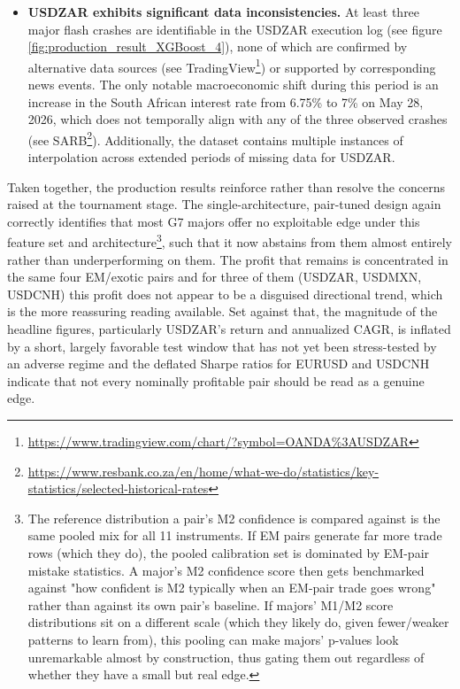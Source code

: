 \documentclass[12pt, a4paper]{article}
\begin{document}
\begin{itemize}
\item \textbf{USDZAR exhibits significant data inconsistencies.} At least three major flash crashes are identifiable in the USDZAR execution log 
(see figure \ref{fig:production_result_XGBoost_4}), none of which are confirmed by alternative data sources (see TradingView\footnote{\url{https://www.tradingview.com/chart/?symbol=OANDA\%3AUSDZAR}}) 
or supported by corresponding news events. The only notable macroeconomic shift during this period is an increase in the South African interest rate from 6.75\% to 7\% on 
May 28, 2026, which does not temporally align with any of the three observed crashes (see SARB\footnote{\url{https://www.resbank.co.za/en/home/what-we-do/statistics/key-statistics/selected-historical-rates}}). 
Additionally, the dataset contains multiple instances of interpolation across extended periods of missing data for USDZAR.
\end{itemize}

\medskip

Taken together, the production results reinforce rather than resolve the concerns raised at the tournament stage. The single-architecture, pair-tuned design again correctly 
identifies that most G7 majors offer no exploitable edge under this feature set and architecture\footnote{The reference distribution a pair's M2 confidence is compared against is the same pooled mix for 
all 11 instruments. If EM pairs generate far more trade rows (which they do), the pooled calibration set is dominated by EM-pair mistake statistics. A major's M2 confidence score 
then gets benchmarked against "how confident is M2 typically when an EM-pair trade goes wrong" rather than against its own pair's baseline. 
If majors' M1/M2 score distributions sit on a different scale (which they likely do, given fewer/weaker patterns to learn from), this pooling can make majors' p-values look 
unremarkable almost by construction, thus gating them out regardless of whether they have a small but real edge.}, such that it now abstains from them almost entirely rather than underperforming on them. 
The profit that remains is concentrated in the same four EM/exotic pairs and for three of them (USDZAR, USDMXN, USDCNH) this profit does not appear to be a disguised directional 
trend, which is the more reassuring reading available. Set against that, the magnitude of the headline figures, particularly USDZAR's return and annualized CAGR, is inflated by a 
short, largely favorable test window that has not yet been stress-tested by an adverse regime and the deflated Sharpe ratios for EURUSD and USDCNH indicate that not every 
nominally profitable pair should be read as a genuine edge.
\end{document}
